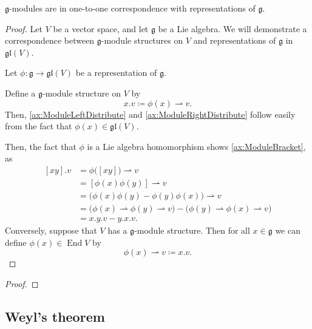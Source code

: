 \documentclass{article}
\newcommand{\lb}[1]{\ensuremath{\left[{#1}\right]}}
\DeclareMathOperator{\End}{End}
\newcommand*\frkg{{\ensuremath{\mathfrak{g}}}}
\newcommand*\glalg{\ensuremath{\mathfrak{gl}}}
\begin{document}
\begin{proposition}
    $\frkg$-modules are in one-to-one correspondence with representations of $\frkg$.
\end{proposition}

\begin{proof}
    Let $V$ be a vector space, and let $\frkg$ be a Lie algebra.
    We will demonstrate a correspondence between $\frkg$-module structures on $V$ and representations of $\frkg$ in $\glalg(V)$.

    Let $\phi: \frkg \to \glalg(V)$ be a representation of $\frkg$.

    Define a $\frkg$-module structure on $V$ by
    \[
        x.v
        \coloneq
        \phi(x) \rightharpoonup v.
    \]
    Then, \ref{ax:ModuleLeftDistribute} and \ref{ax:ModuleRightDistribute} follow easily from the fact that $\phi(x) \in \glalg(V)$.

    Then, the fact that $\phi$ is a Lie algebra homomorphism shows \ref{ax:ModuleBracket}, as
    \begin{align*}
        \lb{xy}.v
        &=
        \phi\Big(\lb{xy}\Big) \rightharpoonup v
        \\
        &=
        \lb{\phi(x)\phi(y)} \rightharpoonup v
        \\
        &=
        \Big(
            \phi(x)\phi(y) - \phi(y)\phi(x)
        \Big)
        \rightharpoonup v
        \\
        &=
        \Big(
            \phi(x) \rightharpoonup \phi(y) \rightharpoonup v
        \Big) 
        -
        \Big(
            \phi(y) \rightharpoonup \phi(x) \rightharpoonup v
        \Big) 
        \\
        &=
        x.y.v - y.x.v.
    \end{align*}
    Conversely, suppose that $V$ has a $\frkg$-module structure.
    Then for all $x \in \frkg$ we can define $\phi(x) \in \End V$ by
    \[
        \phi(x) \rightharpoonup v
        \coloneq
        x.v.
    \]
\end{proof}

\begin{theorem}
\end{theorem}
\begin{proof}
\end{proof}

\subsection{Weyl's theorem}
\end{document}
